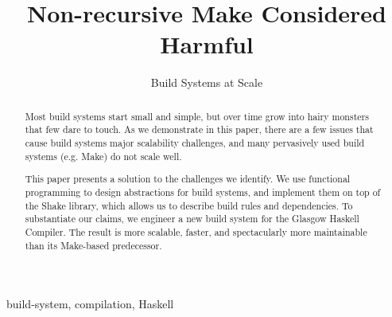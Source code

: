 \documentclass{sigplanconf}
\begin{document}
\toappear{}

\setlength{\pdfpageheight}{\paperheight}
\setlength{\pdfpagewidth}{\paperwidth}


\title{Non-recursive Make Considered Harmful}
\subtitle{Build Systems at Scale}


\maketitle
\begin{abstract}
Most build systems start small and simple, but over time grow into hairy monsters
that few dare to touch. As we demonstrate in this paper, there are a few issues
that cause build systems major scalability challenges, and many pervasively
used build systems (e.g. Make) do not scale well.

This paper presents a solution to the challenges we identify. We use functional
programming to design abstractions for build systems, and implement
them on top of the Shake library, which allows us to describe build rules and
dependencies. To substantiate our claims, we engineer a new build system
for the Glasgow Haskell Compiler. The result is more scalable, faster, and
spectacularly more maintainable than its Make-based predecessor.
\end{abstract}

\keywords build-system, compilation, Haskell












\balance

\end{document}
